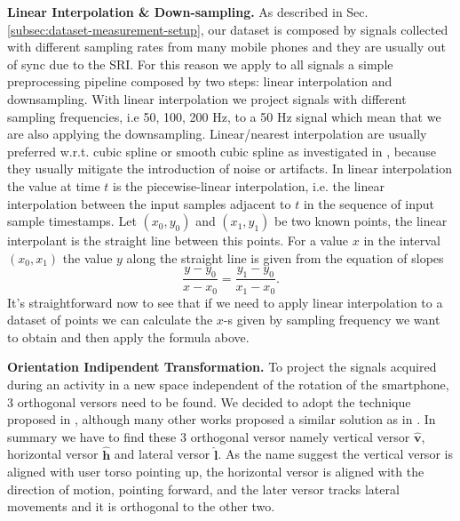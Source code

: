 \textbf{Linear Interpolation \& Down-sampling.} As described in
Sec. \ref{subsec:dataset-measurement-setup}, our dataset is composed
by signals collected with different sampling rates from many mobile
phones and they are usually out of sync due to the SRI. For this
reason we apply to all signals a simple preprocessing pipeline
composed by two steps: linear interpolation and downsampling. With
linear interpolation we project signals with different sampling
frequencies, i.e 50, 100, 200 Hz, to a 50 Hz signal which mean that
we are also applying the downsampling. Linear/nearest interpolation
are usually preferred w.r.t. cubic spline or smooth cubic spline as
investigated in \cite{stisen2015smart}, because they usually mitigate
the introduction of noise or artifacts. In linear interpolation the
value at time $t$ is the piecewise-linear interpolation, i.e. the
linear interpolation between the input samples adjacent to $t$ in the
sequence of input sample timestamps. Let $(x_0, y_0)$ and $(x_1, y_1)$
be two known points, the linear interpolant is the straight line
between this points. For a value $x$ in the interval $(x_0, x_1)$ the
value $y$ along the straight line is given from the equation of slopes
\begin{equation}
  \label{eq:linear-interpolation}
  \frac{y - y_0}{x - x_0} = \frac{y_1 - y_0}{x_1 - x_0}.
\end{equation}
It's straightforward now to see that if we need to apply linear
interpolation to a dataset of points we can calculate the \mbox{$x$-s}
given by sampling frequency we want to obtain and then apply the
formula above.


\vspace{1em}
\textbf{Orientation Indipendent Transformation.}
To project the signals acquired during an activity in a new space independent of the rotation of the smartphone, 3 orthogonal versors need to be found. We decided to adopt the technique proposed in \cite{gadaleta2018idnet}, although many other works proposed a similar solution as in \cite{kunze2009way, henpraserttae2011accurate}. In summary we have to find these 3 orthogonal versor namely vertical versor $\boldsymbol{\hat{v}}$, horizontal versor $\boldsymbol{\hat{h}}$ and lateral versor $\boldsymbol{\hat{l}}$. As the name suggest the vertical versor is aligned with user torso pointing up, the horizontal versor is aligned with the direction of motion, pointing forward, and the later versor tracks lateral movements and it is orthogonal to the other two.

